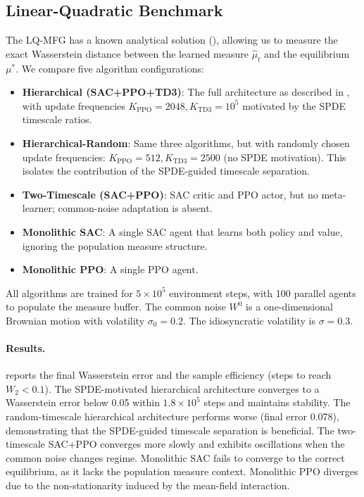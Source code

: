 \subsection{Linear-Quadratic Benchmark}

The LQ-MFG has a known analytical solution (), allowing us
to measure the exact Wasserstein distance between the learned measure $\hat\mu_t$ and
the equilibrium $\mu^*$. We compare five algorithm configurations:

\begin{itemize}
    \item \textbf{Hierarchical (SAC+PPO+TD3)}: The full architecture as described in
    , with update frequencies $K_{\mathrm{PPO}} = 2048,
    K_{\mathrm{TD3}} = 10^5$ motivated by the SPDE timescale ratios.
    \item \textbf{Hierarchical-Random}: Same three algorithms, but with randomly
    chosen update frequencies: $K_{\mathrm{PPO}} = 512, K_{\mathrm{TD3}} = 2500$ (no
    SPDE motivation). This isolates the contribution of the SPDE-guided timescale
    separation.
    \item \textbf{Two-Timescale (SAC+PPO)}: SAC critic and PPO actor, but no
    meta-learner; common-noise adaptation is absent.
    \item \textbf{Monolithic SAC}: A single SAC agent that learns both policy and
    value, ignoring the population measure structure.
    \item \textbf{Monolithic PPO}: A single PPO agent.
\end{itemize}

All algorithms are trained for $5 \times 10^5$ environment steps, with 100 parallel
agents to populate the measure buffer. The common noise $W^0$ is a one-dimensional
Brownian motion with volatility $\sigma_0 = 0.2$. The idiosyncratic volatility is
$\sigma = 0.3$.

\paragraph{Results.}  reports the final Wasserstein
error and the sample efficiency (steps to reach $W_2 < 0.1$). The SPDE-motivated
hierarchical architecture converges to a Wasserstein error below 0.05 within
$1.8 \times 10^5$ steps and maintains stability. The random-timescale hierarchical
architecture performs worse (final error 0.078), demonstrating that the SPDE-guided
timescale separation is beneficial. The two-timescale SAC+PPO converges more slowly
and exhibits oscillations when the common noise changes regime. Monolithic SAC fails
to converge to the correct equilibrium, as it lacks the population measure context.
Monolithic PPO diverges due to the non-stationarity induced by the mean-field
interaction.

